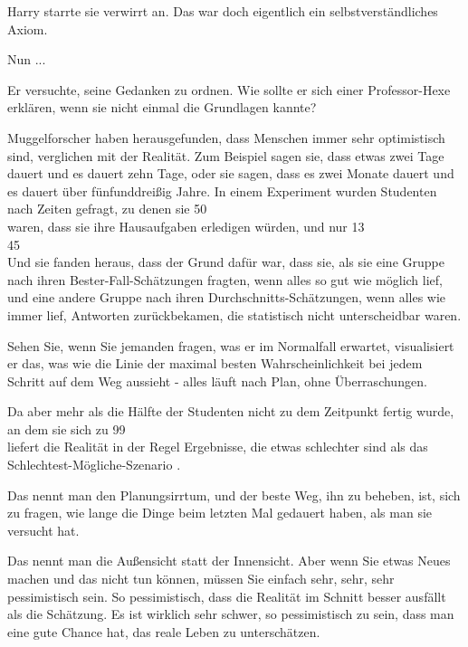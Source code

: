 Harry starrte sie verwirrt an. Das war doch eigentlich ein selbstverständliches
Axiom.

\glqq Nun ...\grqq{}

Er versuchte, seine Gedanken zu ordnen. Wie sollte er sich einer Professor-Hexe
erklären, wenn sie nicht einmal die Grundlagen kannte?

\glqq Muggelforscher haben herausgefunden, dass Menschen immer sehr optimistisch
sind, verglichen mit der Realität. Zum Beispiel sagen sie, dass etwas zwei
Tage dauert und es dauert zehn Tage, oder sie sagen, dass es zwei Monate
dauert und es dauert über fünfunddreißig Jahre. In einem Experiment wurden
Studenten nach Zeiten gefragt, zu denen sie 50 \\%
waren, dass sie ihre Hausaufgaben erledigen würden, und nur 13 \\%
45 \\%

Und sie fanden heraus, dass der Grund dafür war, dass sie, als sie eine Gruppe
nach ihren Bester-Fall-Schätzungen fragten, wenn alles so gut wie möglich
lief, und eine andere Gruppe nach ihren Durchschnitts-Schätzungen, wenn
alles wie immer lief, Antworten zurückbekamen, die statistisch nicht
unterscheidbar waren.

Sehen Sie, wenn Sie jemanden fragen, was er im Normalfall erwartet, visualisiert
er das, was wie die Linie der maximal besten Wahrscheinlichkeit bei jedem
Schritt auf dem Weg aussieht - alles läuft nach Plan, ohne Überraschungen.

Da aber mehr als die Hälfte der Studenten nicht zu dem Zeitpunkt fertig wurde,
an dem sie sich zu 99 \\%
liefert die Realität in der Regel Ergebnisse, die etwas schlechter sind als
das \glqq Schlechtest-Mögliche-Szenario\grqq{} .

Das nennt man den Planungsirrtum, und der beste Weg, ihn zu beheben, ist, sich
zu fragen, wie lange die Dinge beim letzten Mal gedauert haben, als man sie
versucht hat.

Das nennt man die Außensicht statt der Innensicht. Aber wenn Sie etwas Neues
machen und das nicht tun können, müssen Sie einfach sehr, sehr, sehr
pessimistisch sein. So pessimistisch, dass die Realität im Schnitt besser
ausfällt als die Schätzung. Es ist wirklich sehr schwer, so pessimistisch zu
sein, dass man eine gute Chance hat, das reale Leben zu unterschätzen.

